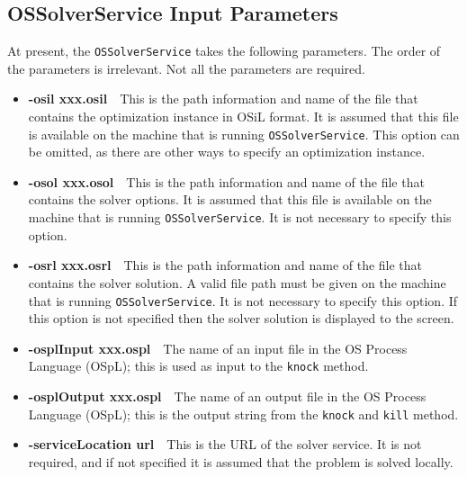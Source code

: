 \documentclass[11pt]{article}
\renewcommand{\_}{{\char"5F}}
\renewcommand{\{}{{\char"7B}}
\renewcommand{\}}{{\char"7D}}
\renewcommand{\^}{{\char"0D}}
\renewcommand{\'}{{\char"0D}}
\begin{document}
\begin{enumerate}[Step 1:]
\subsection{OSSolverService Input Parameters}

At present, the {\tt OSSolverService} takes the following parameters. The order of the parameters is irrelevant.
Not all the parameters are required. 

\begin{itemize}

\item[] {\bf -osil xxx.osil}\ \ This is the path information and name of the
file that contains the optimization instance in OSiL format.
It is assumed that this file is available on the machine that is running
{\tt OSSolverService}. This option can be omitted, as there are other ways
to specify an optimization instance.

\item[] {\bf -osol xxx.osol}\ \ This is the path information and name of the file that contains the solver 
options. It is assumed that this file is available on the machine that is running {\tt OSSolverService}. 
It is not necessary to specify this option.

\item[] {\bf -osrl xxx.osrl}\ \ This is the path information and name of the file that contains the solver 
solution. A valid file path must be given on the machine that is running {\tt OSSolverService}. 
It is not necessary to specify this option.
If this option is not specified then the solver solution is displayed to the screen.


\item[] {\bf -osplInput xxx.ospl}\ \  The name of an input file in the  OS Process Language (OSpL); 
this is used as input  to the {\tt knock} method.

\item[] {\bf -osplOutput xxx.ospl}\ \  The name of an output file in the  OS Process Language (OSpL); 
this is the  output  string from the {\tt knock}  and {\tt kill} method.

\item[] {\bf -serviceLocation url}\ \ This is the URL of the solver service.
It is not required, and if not specified it is assumed that the problem
is solved locally.


\end{itemize}
\end{enumerate}
\end{document}
